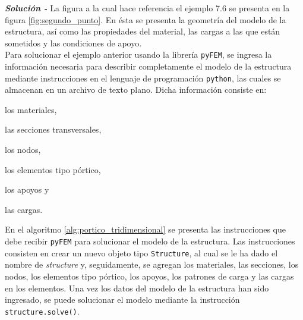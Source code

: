\textit{\textbf{Solución -}} La figura a la cual hace referencia el ejemplo 7.6 se presenta en la figura \ref{fig:segundo_punto}. En ésta se presenta la geometría del modelo de la estructura, así como las propiedades del material, las cargas a las que están sometidos y las condiciones de apoyo. \\

Para solucionar el ejemplo anterior usando la librería \texttt{pyFEM}, se ingresa la información necesaria para describir completamente el modelo de la estructura mediante instrucciones en el lenguaje de programación \texttt{python}, las cuales se almacenan en un archivo de texto plano. Dicha información consiste en:
\begin{inparaenum}[$ (1) $]
    \item los materiales, 
    \item las secciones transversales, 
    \item los nodos, 
    \item los elementos tipo pórtico, 
    \item los apoyos y
    \item las cargas.
\end{inparaenum}

En el algoritmo \ref{alg:portico_tridimensional} se presenta las instrucciones que debe recibir \texttt{pyFEM} para solucionar el modelo de la estructura. Las instrucciones consisten en crear un nuevo objeto tipo \texttt{Structure}, al cual se le ha dado el nombre de \textit{structure} y, seguidamente, se agregan los materiales, las secciones, los nodos, los elementos tipo pórtico, los apoyos, los patrones de carga y las cargas en los elementos. Una vez los datos del modelo de la estructura han sido ingresado, se puede solucionar el modelo mediante la instrucción \texttt{structure.solve()}.

